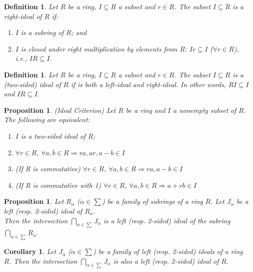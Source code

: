 \documentclass[a4paper,8pt]{article}
\theoremstyle{theorem}
\newtheorem{corollary}[theorem]{Corollary}
\newtheorem{proposition}[theorem]{Proposition}
\newtheorem{definition}[theorem]{Definition}
\begin{document}
\begin{definition}
Let $R$ be a ring, $I \subseteq R$ a subset and $r \in R$. The subset $I \subseteq R$ is a \textit{{\color{blue} right-ideal}} of $R$ if:
\begin{enumerate}[label=(\roman*)]
\item $I$ is a subring of $R$; and
\item $I$ is closed under right multiplication by elements from $R$: $Ir \subseteq I$ ($\forall r \in R$), i.e., $IR \subseteq I$.
\end{enumerate}
\end{definition}


\begin{definition}
Let $R$ be a ring, $I \subseteq R$ a subset and $r \in R$. The subset $I \subseteq R$ is a \textit{{\color{blue} (two-sided) ideal}} of $R$ if is both a left-ideal and right-ideal. In other words, $RI \subseteq I$ and $IR \subseteq I$.
\end{definition}


\begin{proposition}
\textit{{\color{blue} (Ideal Criterion)}} Let $R$ be a ring and $I$ a nonempty subset of $R$. The following are equivalent:
\begin{enumerate}[label=(\roman*)]
\item $I$ is a two-sided ideal of $R$;
\item $\forall r \in R$, $\forall a, b \in R \Rightarrow ra, ar, a-b \in I$
\item (If R is commutative) $\forall r \in R$, $\forall a, b \in R \Rightarrow ra, a-b \in I$
\item (If R is commutative with 1) $\forall r \in R$, $\forall a, b \in R \Rightarrow a+rb \in I$
\end{enumerate}
\end{proposition}


\begin{proposition}
Let $R_\alpha$ ($\alpha \in \sum$) be a family of subrings of a ring $R$. Let $J_\alpha$ be a left (resp. 2-sided) ideal of $R_\alpha$.\\
Then the intersection $\bigcap\limits_{\alpha \in \sum}J_\alpha$ is a left (resp. 2-sided) ideal of the subring $\bigcap\limits_{\alpha \in \sum}R_\alpha$.\\
\end{proposition}


\begin{corollary}
Let $J_\alpha$ ($\alpha \in \sum$) be a family of left (resp. 2-sided) ideals of a ring $R$. Then the intersection $\bigcap\limits_{\alpha \in \sum}J_\alpha$ is also a left (resp. 2-sided) ideal of $R$.\\
\end{corollary}
\end{document}
